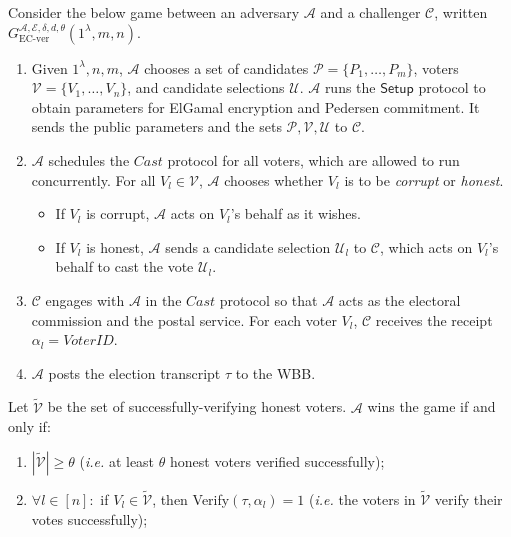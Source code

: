 \documentclass[12pt,a4paper]{article}
\theoremstyle{definition}
\newcommand{\VoterID}{\mathit{VoterID}}
\newcommand{\ie}{\textit{i.e. }}
\begin{document}
\begin{definition}[EC Verifiability]
    Consider the below game between an adversary $\mathcal{A}$ and a challenger $\mathcal{C}$, written $G_\text{EC-ver}^{\mathcal{A},\mathcal{E},\delta,d,\theta}(1^\lambda, m, n)$.
    \begin{enumerate}
        \item Given $1^\lambda, n, m$, $\mathcal{A}$ chooses a set of candidates $\mathcal{P}=\{P_1,\ldots,P_m\}$, voters $\mathcal{V}=\{V_1,\ldots,V_n\}$, and candidate selections $\mathcal{U}$. $\mathcal{A}$ runs the $\mathsf{Setup}$ protocol to obtain parameters for ElGamal encryption and Pedersen commitment. It sends the public parameters and the sets $\mathcal{P}, \mathcal{V}, \mathcal{U}$ to $\mathcal{C}$.
        
        \item $\mathcal{A}$ schedules the $\mathit{Cast}$ protocol for all voters, which are allowed to run concurrently. For all $V_l\in\mathcal{V}$, $\mathcal{A}$ chooses whether $V_l$ is to be \textit{corrupt} or \textit{honest}.
        \begin{itemize}
            \item If $V_l$ is corrupt, $\mathcal{A}$ acts on $V_l$'s behalf as it wishes.
            \item If $V_l$ is honest, $\mathcal{A}$ sends a candidate selection $\mathcal{U}_l$ to $\mathcal{C}$, which acts on $V_l$'s behalf to cast the vote $\mathcal{U}_l$.
        \end{itemize}

        \item $\mathcal{C}$ engages with $\mathcal{A}$ in the $\mathit{Cast}$ protocol so that $\mathcal{A}$ acts as the electoral commission and the postal service. For each voter $V_l$, $\mathcal{C}$ receives the receipt $\alpha_l=\VoterID$.

        \item $\mathcal{A}$ posts the election transcript $\tau$ to the WBB.
    \end{enumerate}
    Let $\tilde{\mathcal{V}}$ be the set of successfully-verifying honest voters. $\mathcal{A}$ wins the game if and only if:
    \begin{enumerate}
        \item $|\tilde{\mathcal{V}}| \geq \theta$ (\ie at least $\theta$ honest voters verified successfully);
        \item $\forall l \in [n]:$ if $V_l \in \tilde{\mathcal{V}}$, then Verify$(\tau, \alpha_l) 	=1$ (\ie the voters in $\tilde{\mathcal{V}}$ verify their votes successfully);
    

\end{enumerate}
\end{definition}
\end{document}
